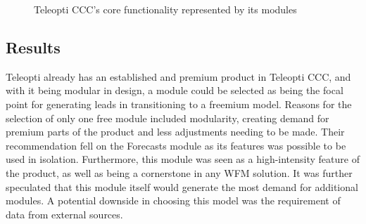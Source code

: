 \begin{figure}[H]
    \centering
    \caption{Teleopti CCC's core functionality represented by its modules~\cite{teleopti2016}}
    \label{fig:teleopticcc}
\end{figure}

\subsection{Results}
Teleopti already has an established and premium product in Teleopti CCC, and with it being modular in design, a module could be selected as being the focal point for generating leads in transitioning to a freemium model. Reasons for the selection of only one free module included modularity, creating demand for premium parts of the product and less adjustments needing to be made. Their recommendation fell on the Forecasts module as its features was possible to be used in isolation. Furthermore, this module was seen as a high-intensity feature of the product, as well as being a cornerstone in any WFM solution. It was further speculated that this module itself would generate the most demand for additional modules. A potential downside in choosing this model was the requirement of data from external sources.


